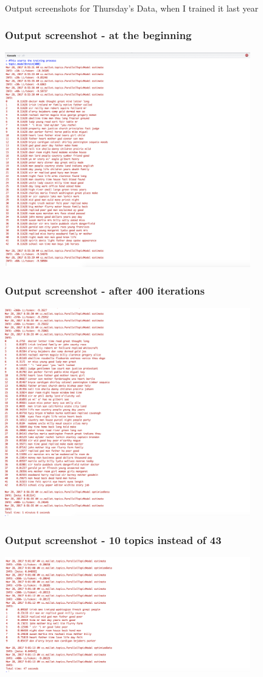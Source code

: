 \documentclass{beamer}
\begin{document}
\begin{frame}
\frametitle{}
\centering
\Large{Output screenshots for Thursday's Data, when I trained it last year}
\end{frame}

\begin{frame}
\frametitle{Output screenshot - at the beginning}
\includegraphics[width=0.8\textwidth]{topicsoutput.png}
\end{frame}

\begin{frame}
\frametitle{Output screenshot - after 400 iterations}
\includegraphics[width=0.8\textwidth]{topicsoutput-final.png}
\end{frame}

\begin{frame}
\frametitle{Output screenshot - 10 topics instead of 43}
\includegraphics[width=0.8\textwidth]{topicsoutput-10topics.png}
\end{frame}
\end{document}
